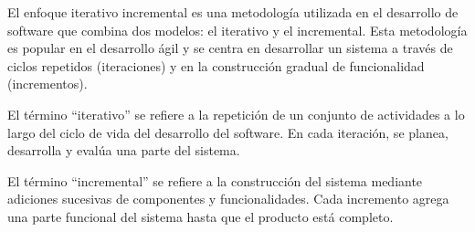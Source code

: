 El enfoque iterativo incremental es una metodología utilizada en el desarrollo de software que combina dos modelos:
el iterativo y el incremental.
Esta metodología es popular en el desarrollo ágil y se centra en desarrollar un sistema a través de ciclos repetidos
(iteraciones) y en la construcción gradual de funcionalidad (incrementos).

El término ``iterativo'' se refiere a la repetición de un conjunto de actividades a lo largo del ciclo de vida del
desarrollo del software.
En cada iteración, se planea, desarrolla y evalúa una parte del sistema.

El término ``incremental'' se refiere a la construcción del sistema mediante adiciones sucesivas de componentes y
funcionalidades.
Cada incremento agrega una parte funcional del sistema hasta que el producto está completo.